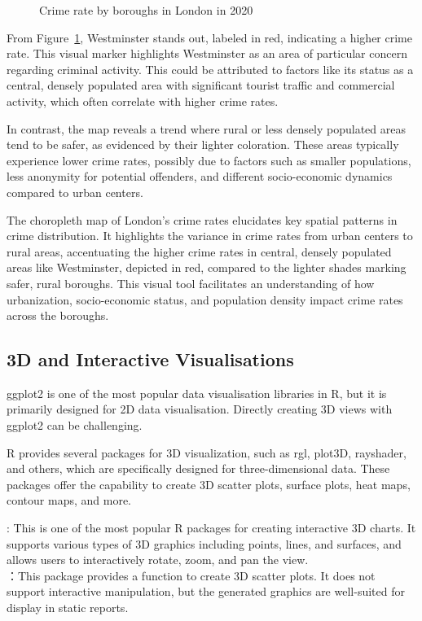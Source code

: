 \documentclass{article}\usepackage[]{graphicx}\usepackage[]{xcolor}
\newenvironment{knitrout}{}{} %
\begin{document}
\begin{figure}[H]
\begin{knitrout}
{}


\end{knitrout}
\centering
\caption{Crime rate by boroughs in London in 2020}
\label{fig:crime rate london}
\end{figure}

From Figure~\ref{fig:crime rate london}, Westminster stands out, labeled in red, indicating a higher crime rate. This visual marker highlights Westminster as an area of particular concern regarding criminal activity. This could be attributed to factors like its status as a central, densely populated area with significant tourist traffic and commercial activity, which often correlate with higher crime rates.

In contrast, the map reveals a trend where rural or less densely populated areas tend to be safer, as evidenced by their lighter coloration. These areas typically experience lower crime rates, possibly due to factors such as smaller populations, less anonymity for potential offenders, and different socio-economic dynamics compared to urban centers.

The choropleth map of London’s crime rates elucidates key spatial patterns in crime distribution. It highlights the variance in crime rates from urban centers to rural areas, accentuating the higher crime rates in central, densely populated areas like Westminster, depicted in red, compared to the lighter shades marking safer, rural boroughs. This visual tool facilitates an understanding of how urbanization, socio-economic status, and population density impact crime rates across the boroughs.

\subsection{3D and Interactive Visualisations}
ggplot2 is one of the most popular data visualisation libraries in R, but it is primarily designed for 2D data visualisation. Directly creating 3D views with ggplot2 can be challenging.


R provides several packages for 3D visualization, such as rgl, plot3D, rayshader, and others, which are specifically designed for three-dimensional data. These packages offer the capability to create 3D scatter plots, surface plots, heat maps, contour maps, and more.


: This is one of the most popular R packages for creating interactive 3D charts. It supports various types of 3D graphics including points, lines, and surfaces, and allows users to interactively rotate, zoom, and pan the view.\\
：This package provides a function to create 3D scatter plots. It does not support interactive manipulation, but the generated graphics are well-suited for display in static reports.
\end{document}
